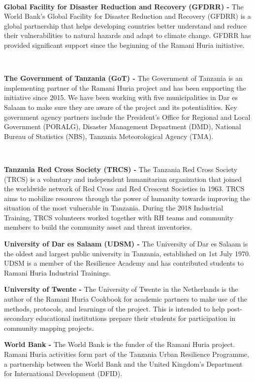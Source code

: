 \documentclass[a4paper,12pt,twoside]{article}
\begin{document}
\begin{multicols}
\

\textbf{Global Facility for Disaster Reduction and Recovery (GFDRR) -} The World Bank’s Global Facility for Disaster Reduction and Recovery (GFDRR) is a global partnership that helps developing countries better understand and reduce their vulnerabilities to natural hazards and adapt to climate change. GFDRR has provided significant support since the beginning of the Ramani Huria initiative.

\

\textbf{The Government of Tanzania (GoT) -} The Government of Tanzania is an implementing partner of the Ramani Huria project and has been supporting the initiative since 2015. We have been working with five municipalities in Dar es Salaam to make sure they are aware of the project and its potentialities. Key government agency partners include the President’s Office for Regional and Local Government (PORALG), Disaster Management Department (DMD), National Bureau of Statistics (NBS), Tanzania Meteorological Agency (TMA).

\

\textbf{Tanzania Red Cross Society (TRCS) -} The Tanzania Red Cross Society (TRCS) is a voluntary and independent humanitarian organization that joined the worldwide network of Red Cross and Red Crescent Societies in 1963. TRCS aims to mobilize resources through the power of humanity towards improving the situation of the most vulnerable in Tanzania. During the 2018 Industrial Training, TRCS volunteers worked together with RH teams and community members to build the community asset and threat inventories.

\textbf{University of Dar es Salaam (UDSM) -} The University of Dar es Salaam is the oldest and largest public university in Tanzania, established on 1st July 1970. UDSM is a member of the Resilience Academy and has contributed students to Ramani Huria Industrial Trainings. 

\textbf{University of Twente -} The University of Twente in the Netherlands is the author of the Ramani Huria Cookbook for academic partners to make use of the methods, protocols, and learnings of the project. This is intended to help post-secondary educational institutions prepare their students for participation in community mapping projects. 

\textbf{World Bank -} The World Bank is the funder of the Ramani Huria project. Ramani Huria activities form part of the Tanzania Urban Resilience Programme, a partnership between the World Bank and the United Kingdom’s Department for International Development (DFID).
\end{multicols}
\end{document}
